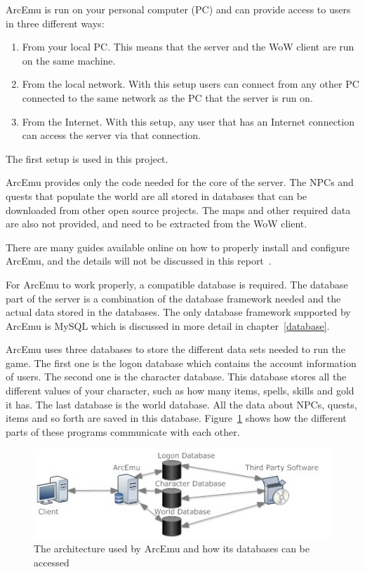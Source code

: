 ArcEmu is run on your personal computer (PC) and can provide access to users in three different ways:

\begin{enumerate}
	\item From your local PC. 
	This means that the server and the WoW client are run on the same machine.
	\item From the local network.
	With this setup users can connect from any other PC connected to the same network as the PC that the server is run on.
	\item From the Internet.
	With this setup, any user that has an Internet connection can access the server via that connection.
\end{enumerate}

The first setup is used in this project. 

ArcEmu provides only the code needed for the core of the server. The NPCs and quests that populate the world are all stored in databases that can be downloaded from other open source projects. The maps and other required data are also not provided, and need to be extracted from the WoW client.

There are many guides available online on how to properly install and configure ArcEmu, and the details will not be discussed in this report~\cite{arcemu}.

For ArcEmu to work properly, a compatible database is required. The database part of the server is a combination of the database framework needed and the actual data stored in the databases.
The only database framework supported by ArcEmu is MySQL which is discussed in more detail in chapter~\ref{database}.

ArcEmu uses three databases to store the different data sets needed to run the game. The first one is the logon database which contains the account information of users. The second one is the character database. This database stores all the different values of your character, such as how many items, spells, skills and gold it has. The last database is the world database. All the data about NPCs, quests, items and so forth are saved in this database. Figure~\ref{arcdata} shows how the different parts of these programs communicate with each other.

\begin{figure}[htbp]
\centering
\includegraphics[scale = 0.65]{arcemu.jpg}	
\caption{The architecture used by ArcEmu and how its databases can be accessed}
\label{arcdata}
\end{figure}



